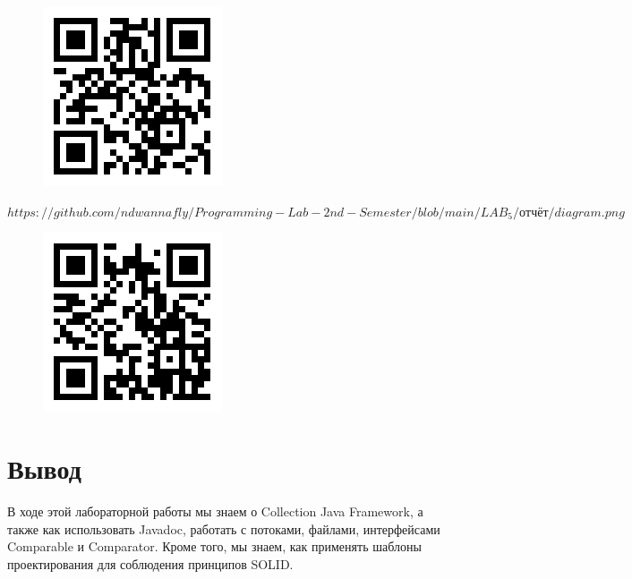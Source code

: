 \begin{figure}[H]
\includegraphics[scale=0.8]{img/SourceCode}
\label{pic:SourceCode}
\end{figure}

\underline{$https://github.com/ndwannafly/Programming-Lab-2nd-Semester/blob/main/LAB_5/отчёт/diagram.png$}\\


\begin{figure}[H]
\includegraphics[scale=0.8]{img/QRDiagram}
\label{pic:QRDiagram}
\end{figure}

\section{Вывод}
В ходе этой лабораторной работы мы знаем о Collection Java Framework, а также как использовать Javadoc, работать с потоками, файлами, интерфейсами Comparable и Comparator. Кроме того, мы знаем, как применять шаблоны проектирования для соблюдения принципов SOLID.